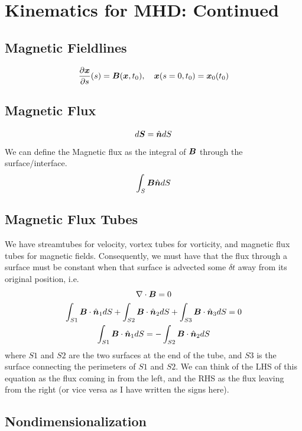 \documentclass{article}
\begin{document}
\section{Kinematics for MHD: Continued}

\subsection{Magnetic Fieldlines}

\begin{gather*}
    \frac{\partial \boldsymbol{x}}{\partial s}(s) = \boldsymbol{B}(\boldsymbol{x},t_0), \quad \boldsymbol{x}(s=0,t_0) = \boldsymbol{x}_0(t_0)
\end{gather*}

\subsection{Magnetic Flux}

\begin{gather*}
    d\boldsymbol{S} = \hat{\boldsymbol{n}}dS
\end{gather*}
We can define the Magnetic flux as the integral of $\boldsymbol{B}$ through the
surface/interface. 
\begin{gather*}
    \int_S\boldsymbol{B}\hat{\boldsymbol{n}}dS
\end{gather*}

\subsection{Magnetic Flux Tubes}

We have streamtubes for velocity, vortex tubes for vorticity, and magnetic flux tubes
for magnetic fields. Consequently, we must have that the flux through a surface
must be constant when that surface is advected some $\delta t$ away from its
original position, i.e.
\begin{gather*}
    \nabla \cdot{\boldsymbol{B}} = 0\\
    \int_{S1} \boldsymbol{B}\cdot\hat{\boldsymbol{n}}_1dS + \int_{S2} \boldsymbol{B}\cdot\hat{\boldsymbol{n}}_2dS +
    \int_{S3} \boldsymbol{B}\cdot\hat{\boldsymbol{n}}_3dS = 0\\
     \int_{S1} \boldsymbol{B}\cdot\hat{\boldsymbol{n}}_1dS = - \int_{S2} \boldsymbol{B}\cdot\hat{\boldsymbol{n}}_2dS
\end{gather*}
where $S1$ and $S2$ are the two surfaces at the end of the tube, and $S3$ is the
surface connecting the perimeters of $S1$ and $S2$. We can think of the LHS of
this equation as the flux coming in from the left, and the RHS as the flux
leaving from the right (or vice versa as I have written the signs here). 

\subsection{Nondimensionalization}
\end{document}
